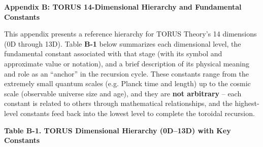 \textbf{Appendix B: TORUS 14-Dimensional Hierarchy and Fundamental
Constants}

This appendix presents a reference hierarchy for TORUS Theory's 14
dimensions (0D through 13D). Table \textbf{B-1} below summarizes each
dimensional level, the fundamental constant associated with that stage
(with its symbol and approximate value or notation), and a brief
description of its physical meaning and role as an ``anchor'' in the
recursion cycle. These constants range from the extremely small quantum
scales (e.g. Planck time and length) up to the cosmic scale (observable
universe size and age), and they are \textbf{not arbitrary} -- each
constant is related to others through mathematical relationships, and
the highest-level constants feed back into the lowest level to complete
the toroidal recursion​.

\textbf{Table B-1. TORUS Dimensional Hierarchy (0D--13D) with Key
Constants}​

